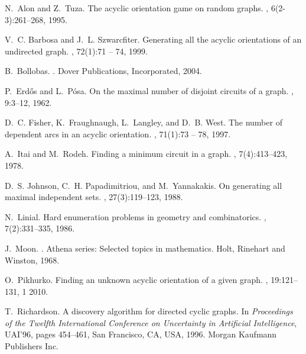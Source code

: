 \documentclass{llncs}
\begin{document}

\begin{thebibliography}{10}

N.~Alon and Z.~Tuza.
\newblock The acyclic orientation game on random graphs.
, 6(2-3):261--268, 1995.

V.~C. Barbosa and J.~L. Szwarcfiter.
\newblock Generating all the acyclic orientations of an undirected graph.
, 72(1):71 -- 74, 1999.

B.~Bollobas.
.
\newblock Dover Publications, Incorporated, 2004.

P.~Erd{\H{o}}s and L.~P{\'o}sa.
\newblock On the maximal number of disjoint circuits of a graph.
, 9:3--12, 1962.

D.~C. Fisher, K.~Fraughnaugh, L.~Langley, and D.~B. West.
\newblock The number of dependent arcs in an acyclic orientation.
, 71(1):73 -- 78,
  1997.

A.~Itai and M.~Rodeh.
\newblock Finding a minimum circuit in a graph.
, 7(4):413--423, 1978.

D.~S. Johnson, C.~H. Papadimitriou, and M.~Yannakakis.
\newblock On generating all maximal independent sets.
, 27(3):119--123, 1988.

N.~Linial.
\newblock Hard enumeration problems in geometry and combinatorics.
, 7(2):331--335,
  1986.

J.~Moon.
.
\newblock Athena series: Selected topics in mathematics. Holt, Rinehart and
  Winston, 1968.

O.~Pikhurko.
\newblock Finding an unknown acyclic orientation of a given graph.
, 19:121--131, 1 2010.

T.~Richardson.
\newblock A discovery algorithm for directed cyclic graphs.
\newblock In {\em Proceedings of the Twelfth International Conference on
  Uncertainty in Artificial Intelligence}, UAI'96, pages 454--461, San
  Francisco, CA, USA, 1996. Morgan Kaufmann Publishers Inc.


\end{thebibliography}
\end{document}
